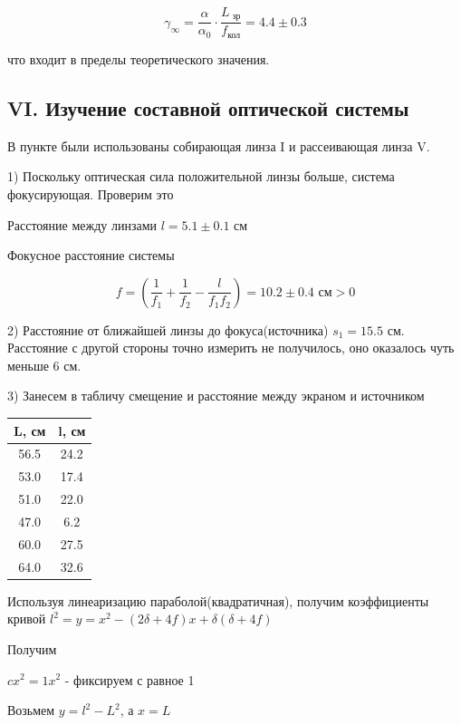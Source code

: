 \documentclass{astroedu-lab}
\begin{document}
\begin{problem}
\begin{equation}
	\gamma_{\infty} = \frac{\alpha}{\alpha_0} \cdot \frac{L_\text{ зр}}{f_\text{кол}} = 4.4 \pm 0.3
\end{equation}

что входит в пределы теоретического значения.

\subsection{VI. Изучение составной оптической системы}

В пункте были использованы собирающая линза I и рассеивающая линза V.

1) Поскольку оптическая сила положительной линзы больше, система фокусирующая. Проверим это

Расстояние между линзами $l = 5.1 \pm 0.1$ см

Фокусное расстояние системы

\begin{equation}
	f = \left( \frac{1}{f_1} + \frac{1}{f_2} - \frac{l}{f_1 f_2} \right) = 10.2 \pm 0.4 \text{ см} > 0
\end{equation}

2) Расстояние от ближайшей линзы до фокуса(источника) $s_1 = 15.5$ см. Расстояние с другой стороны точно измерить не получилось, оно оказалось чуть меньше 6 см.

3) Занесем в табличу смещение и расстояние между экраном и источником

\begin{center}
\begin{tabular}{|c|c|}
\hline 
L, см & l, см \\
\hline
56.5 & 24.2 \\
53.0 & 17.4 \\
51.0 & 22.0 \\
47.0 & 6.2 \\
60.0 & 27.5 \\
64.0 & 32.6 \\
\hline
\end{tabular}
\end{center}

Используя линеаризацию параболой(квадратичная), получим коэффициенты кривой $l^2 = y = x^2 - (2 \delta + 4 f) x + \delta (\delta + 4 f)$

Получим

$c x^2 = 1 x^2$ - фиксируем с равное 1

Возьмем $y = l^2 - L^2$, а $x = L$


\end{problem}
\end{document}
